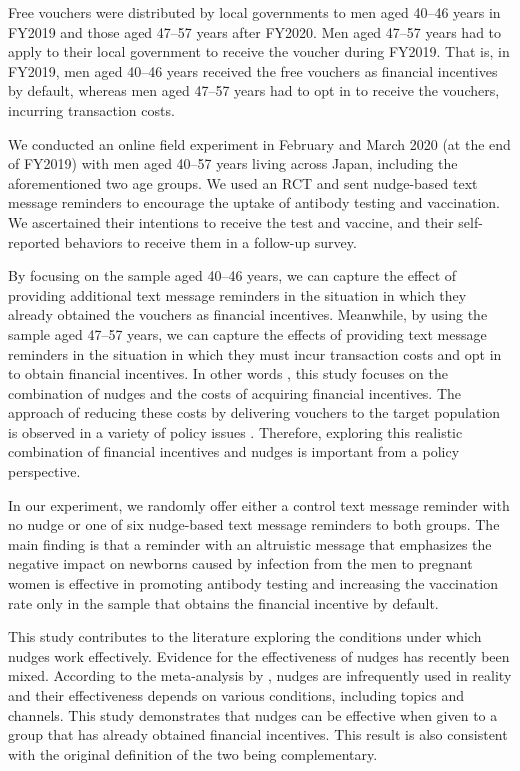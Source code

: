 \documentclass[
  11pt,
  a4paper
]{article}
\begin{document}
Free vouchers were distributed by local governments to men aged 40--46 years in FY2019 and those aged 47--57 years after FY2020. Men aged 47--57 years had to apply to their local government to receive the voucher during FY2019. That is, in FY2019, men aged 40--46 years received the free vouchers as financial incentives by default, whereas men aged 47--57 years had to opt in to receive the vouchers, incurring transaction costs.

We conducted an online field experiment in February and March 2020 (at the end of FY2019) with men aged 40--57 years living across Japan, including the aforementioned two age groups. We used an RCT and sent nudge-based text message reminders to encourage the uptake of antibody testing and vaccination. We ascertained their intentions to receive the test and vaccine, and their self-reported behaviors to receive them in a follow-up survey.

By focusing on the sample aged 40--46 years, we can capture the effect of providing additional text message reminders in the situation in which they already obtained the vouchers as financial incentives. Meanwhile, by using the sample aged 47--57 years, we can capture the effects of providing text message reminders in the situation in which they must incur transaction costs and opt in to obtain financial incentives. In other words , this study focuses on the combination of nudges and the costs of acquiring financial incentives. The approach of reducing these costs by delivering vouchers to the target population is observed in a variety of policy issues \citep[e.g.,][]{Ahmed2011, Kacker2022}. Therefore, exploring this realistic combination of financial incentives and nudges is important from a policy perspective.

In our experiment, we randomly offer either a control text message reminder with no nudge or one of six nudge-based text message reminders to both groups. The main finding is that a reminder with an altruistic message that emphasizes the negative impact on newborns caused by infection from the men to pregnant women is effective in promoting antibody testing and increasing the vaccination rate only in the sample that obtains the financial incentive by default.

This study contributes to the literature exploring the conditions under which nudges work effectively. Evidence for the effectiveness of nudges has recently been mixed. According to the meta-analysis by \citet{DellaVigna2022a}, nudges are infrequently used in reality and their effectiveness depends on various conditions, including topics and channels. This study demonstrates that nudges can be effective when given to a group that has already obtained financial incentives. This result is also consistent with the original definition of the two being complementary.
\end{document}
